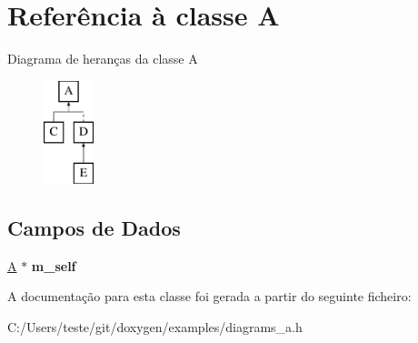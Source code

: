 \hypertarget{class_a}{\section{Referência à classe A}
\label{class_a}
}
Diagrama de heranças da classe A\begin{figure}[H]
\begin{center}
\leavevmode
\includegraphics[height=3.000000cm]{class_a}
\end{center}
\end{figure}
\subsection*{Campos de Dados}
\begin{DoxyCompactItemize}
\item 
\hypertarget{class_a_afb4addbef001bc74a9b8dc36a11435d4}{\hyperlink{class_a}{A} $\ast$ {\bfseries m\-\_\-self}}\label{class_a_afb4addbef001bc74a9b8dc36a11435d4}

\end{DoxyCompactItemize}


A documentação para esta classe foi gerada a partir do seguinte ficheiro\-:\begin{DoxyCompactItemize}
\item 
C\-:/\-Users/teste/git/doxygen/examples/diagrams\-\_\-a.\-h\end{DoxyCompactItemize}
